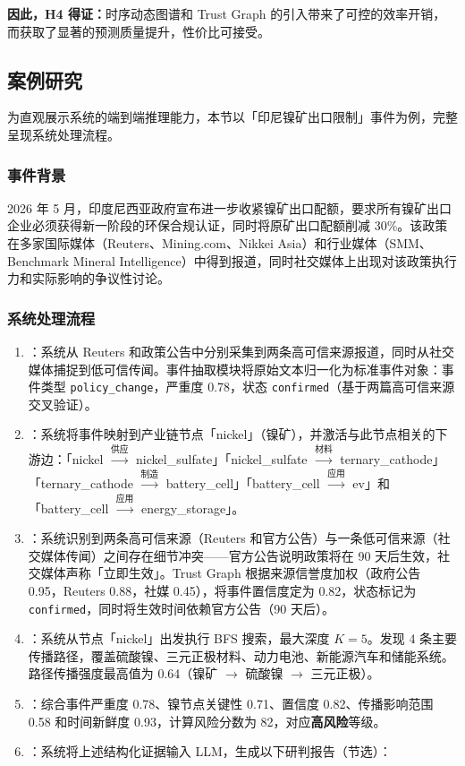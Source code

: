 \textbf{因此，H4 得证：}时序动态图谱和 Trust Graph 的引入带来了可控的效率开销，而获取了显著的预测质量提升，性价比可接受。

\subsection{案例研究}
\label{sec:exp-casestudy}

为直观展示\projectshort 系统的端到端推理能力，本节以「印尼镍矿出口限制」事件为例，完整呈现系统处理流程。

\subsubsection{事件背景}

2026 年 5 月，印度尼西亚政府宣布进一步收紧镍矿出口配额，要求所有镍矿出口企业必须获得新一阶段的环保合规认证，同时将原矿出口配额削减 30\%。该政策在多家国际媒体（Reuters、Mining.com、Nikkei Asia）和行业媒体（SMM、Benchmark Mineral Intelligence）中得到报道，同时社交媒体上出现对该政策执行力和实际影响的争议性讨论。

\subsubsection{系统处理流程}

\begin{enumerate}
    \item {}：系统从 Reuters 和政策公告中分别采集到两条高可信来源报道，同时从社交媒体捕捉到低可信传闻。事件抽取模块将原始文本归一化为标准事件对象：事件类型 \texttt{policy\_change}，严重度 0.78，状态 \texttt{confirmed}（基于两篇高可信来源交叉验证）。
    \item {}：系统将事件映射到产业链节点「nickel」（镍矿），并激活与此节点相关的下游边：「nickel $\xrightarrow{\text{供应}}$ nickel\_sulfate」「nickel\_sulfate $\xrightarrow{\text{材料}}$ ternary\_cathode」「ternary\_cathode $\xrightarrow{\text{制造}}$ battery\_cell」「battery\_cell $\xrightarrow{\text{应用}}$ ev」和「battery\_cell $\xrightarrow{\text{应用}}$ energy\_storage」。
    \item {}：系统识别到两条高可信来源（Reuters 和官方公告）与一条低可信来源（社交媒体传闻）之间存在细节冲突——官方公告说明政策将在 90 天后生效，社交媒体声称「立即生效」。Trust Graph 根据来源信誉度加权（政府公告 0.95，Reuters 0.88，社媒 0.45），将事件置信度定为 0.82，状态标记为 \texttt{confirmed}，同时将生效时间依赖官方公告（90 天后）。
    \item {}：系统从节点「nickel」出发执行 BFS 搜索，最大深度 $K = 5$。发现 4 条主要传播路径，覆盖硫酸镍、三元正极材料、动力电池、新能源汽车和储能系统。路径传播强度最高值为 0.64（镍矿 $\to$ 硫酸镍 $\to$ 三元正极）。
    \item {}：综合事件严重度 0.78、镍节点关键性 0.71、置信度 0.82、传播影响范围 0.58 和时间新鲜度 0.93，计算风险分数为 82，对应\textbf{高风险}等级。
    \item {}：系统将上述结构化证据输入 LLM，生成以下研判报告（节选）：
\end{enumerate}

